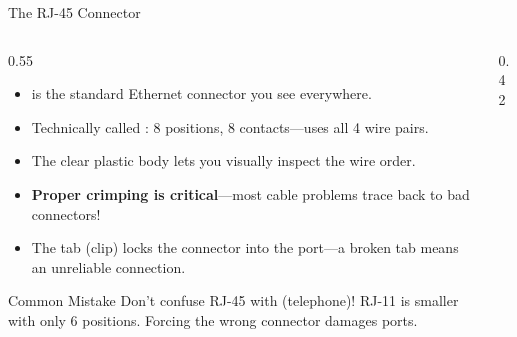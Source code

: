 \documentclass[aspectratio=169]{beamer}  %
\begin{document}
\begin{frame}{The RJ-45 Connector}
    \begin{columns}[T]
        \begin{column}{0.55\textwidth}
            \begin{itemize}
                \small
                \item {} is the standard Ethernet connector you see everywhere.
                \item Technically called : 8 positions, 8 contacts---uses all 4 wire pairs.
                \item The clear plastic body lets you visually inspect the wire order.
                \item \textbf{Proper crimping is critical}---most cable problems trace back to bad connectors!
                \item The tab (clip) locks the connector into the port---a broken tab means an unreliable connection.
            \end{itemize}
            
            \vspace{0.3em}
            \begin{alertblock}{Common Mistake}
                Don't confuse RJ-45 with  (telephone)! RJ-11 is smaller with only 6 positions. Forcing the wrong connector damages ports.
            \end{alertblock}
        \end{column}
        \begin{column}{0.42\textwidth}
            \begin{center}
\end{center}
\end{column}
\end{columns}
\end{frame}
\end{document}
